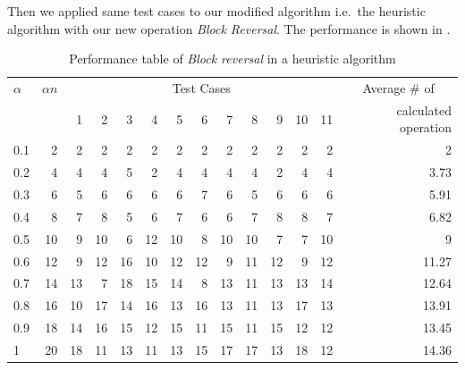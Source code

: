				
Then we applied same test cases to our modified algorithm i.e.\ the
heuristic algorithm with our new operation \textit{Block Reversal}. The
performance is shown in .


\begin{table}[!tb]
  \begin{center}
    \caption{Performance table of \emph{Block reversal} in a heuristic algorithm}
    \label{tab_our}

    \begin{tabular}{|l|r|r|r|r|r|r|r|r|r|r|r|r|r|}
      \hline
      $\alpha$     & $\alpha n$ & \multicolumn{11}{c|}{Test Cases} & \multicolumn{1}{c|}{Average \# of}                                     \\
      \cline{3-13} &            & 1                                & 2  & 3  & 4  & 5  & 6  & 7  & 8  & 9  & 10 & 11 & calculated operation \\
      \hline
      0.1        & 2          & 2                                & 2	& 2  & 2  & 2  & 2  & 2  & 2  &	2  & 2	& 2  & 2                    \\
      0.2        & 4          & 4                                & 4	& 5  & 2  & 4  & 4  & 4  & 4  &	2  & 4	& 4  & 3.73                 \\
      0.3        & 6          & 5                                & 6	& 6  & 6  & 6  & 7  & 6  & 5  &	6  & 6	& 6  & 5.91                 \\
      0.4        & 8          & 7                                & 8	& 5  & 6  & 7  & 6  & 6  & 7  &	8  & 8	& 7  & 6.82                 \\
      0.5        & 10         & 9                                & 10	& 6  & 12 & 10 & 8  & 10 & 10 &	7  & 7	& 10 & 9                    \\
      0.6        & 12         & 9                                & 12	& 16 & 10 & 12 & 12 & 9  & 11 &	12 & 9	& 12 & 11.27                \\
      0.7        & 14         & 13                               & 7	& 18 & 15 & 14 & 8  & 13 & 11 &	13 & 13	& 14 & 12.64                \\
      0.8        & 16         & 10                               & 17	& 14 & 16 & 13 & 16 & 13 & 11 &	13 & 17	& 13 & 13.91                \\
      0.9        & 18         & 14                               & 16	& 15 & 12 & 15 & 11 & 15 & 11 &	15 & 12	& 12 & 13.45                \\
      1          & 20         & 18                               & 11	& 13 & 11 & 13 & 15 & 17 & 17 &	13 & 18	& 12 & 14.36                \\
      \hline
    \end{tabular}
  \end{center}
\end{table}


